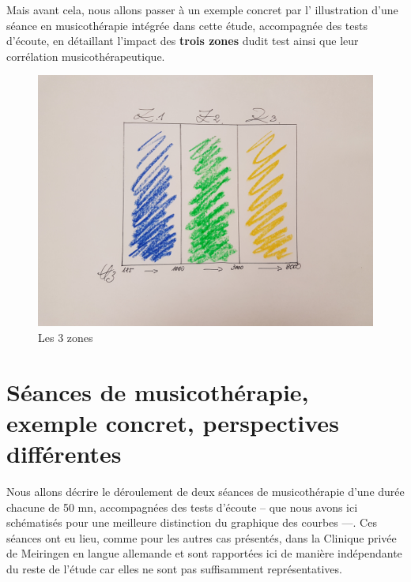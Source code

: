 Mais avant cela, nous allons passer à un exemple concret par l' illustration d'une séance en 
musicothérapie intégrée dans cette étude, accompagnée des tests d'écoute, en détaillant l'impact
des\textbf{ trois zones} dudit test ainsi que  leur corrélation musicothérapeutique.
\begin{figure}
	\centering
	\includegraphics[width=1\linewidth]{images/les3zones.jpg}
	\caption[Les 3 zones]{Les 3 zones}
	\label{Les trois zones du test d'écoute}
\end{figure}


\section{ Séances de musicothérapie, exemple concret, perspectives différentes}


Nous allons décrire le déroulement de deux séances de
musicothérapie d'une durée chacune  de 50 mn,  accompagnées des tests d'écoute -- que nous avons 
ici 
schématisés pour une meilleure 
distinction du graphique des courbes ---. Ces séances ont eu lieu, comme pour les autres cas 
présentés, dans la Clinique privée de Meiringen en langue allemande et sont rapportées ici de
manière indépendante du reste de l'étude car elles ne sont pas
suffisamment représentatives.

